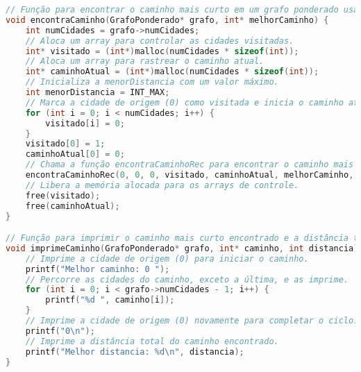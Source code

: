 \documentclass{article}
\begin{document}
\begin{lstlisting}[caption={grafo.c},label={lst:cod1},language=C]
// Função para encontrar o caminho mais curto em um grafo ponderado usando força bruta.
void encontraCaminho(GrafoPonderado* grafo, int* melhorCaminho) {
    int numCidades = grafo->numCidades;
    // Aloca um array para controlar as cidades visitadas.
    int* visitado = (int*)malloc(numCidades * sizeof(int));
    // Aloca um array para rastrear o caminho atual.
    int* caminhoAtual = (int*)malloc(numCidades * sizeof(int));
    // Inicializa a menorDistancia com um valor máximo.
    int menorDistancia = INT_MAX;
    // Marca a cidade de origem (0) como visitada e inicia o caminho atual.
    for (int i = 0; i < numCidades; i++) {
        visitado[i] = 0;
    }
    visitado[0] = 1;
    caminhoAtual[0] = 0;
    // Chama a função encontraCaminhoRec para encontrar o caminho mais curto.
    encontraCaminhoRec(0, 0, 0, visitado, caminhoAtual, melhorCaminho, numCidades, grafo, &menorDistancia);
    // Libera a memória alocada para os arrays de controle.
    free(visitado);
    free(caminhoAtual);
}

// Função para imprimir o caminho mais curto encontrado e a distância total.
void imprimeCaminho(GrafoPonderado* grafo, int* caminho, int distancia) {
    // Imprime a cidade de origem (0) para iniciar o caminho.
    printf("Melhor caminho: 0 ");
    // Percorre as cidades do caminho, exceto a última, e as imprime.
    for (int i = 0; i < grafo->numCidades - 1; i++) {
        printf("%d ", caminho[i]);
    }
    // Imprime a cidade de origem (0) novamente para completar o ciclo.
    printf("0\n");
    // Imprime a distância total do caminho encontrado.
    printf("Melhor distancia: %d\n", distancia);
}


\end{lstlisting}
\end{document}
